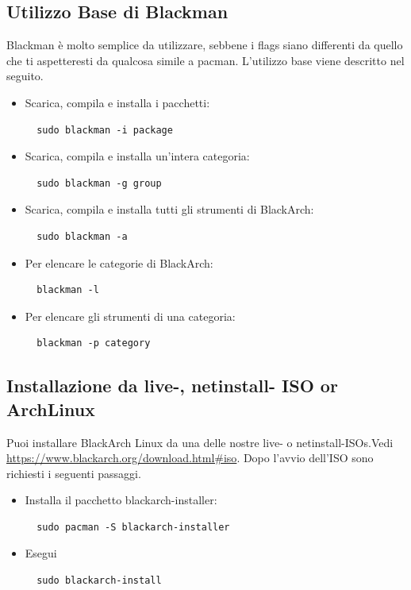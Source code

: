 \documentclass[a4paper, oneside, 11pt]{book}
\begin{document}
\subsection{Utilizzo Base di Blackman} Blackman è molto semplice da utilizzare, sebbene i flags siano differenti da quello che ti aspetteresti da qualcosa simile a pacman. L'utilizzo base viene descritto nel seguito.
\begin{itemize}
\item Scarica, compila e installa i pacchetti:
\begin{lstlisting}
  sudo blackman -i package
\end{lstlisting}

\item Scarica, compila e installa un'intera categoria:
\begin{lstlisting}
  sudo blackman -g group
\end{lstlisting}

\item Scarica, compila e installa tutti gli strumenti di BlackArch:
\begin{lstlisting}
  sudo blackman -a
\end{lstlisting}

\item Per elencare le categorie di BlackArch:
\begin{lstlisting}
  blackman -l
\end{lstlisting}

\item Per elencare gli strumenti di una categoria:
\begin{lstlisting}
  blackman -p category
\end{lstlisting}

\end{itemize}

\subsection{Installazione da live-, netinstall- ISO or ArchLinux}
Puoi installare BlackArch Linux da una delle nostre live- o netinstall-ISOs.Vedi
\url{https://www.blackarch.org/download.html#iso}. Dopo l'avvio dell'ISO sono richiesti i seguenti passaggi.
\begin{itemize}
\item Installa il pacchetto blackarch-installer:
\begin{lstlisting}
  sudo pacman -S blackarch-installer
\end{lstlisting}

\item Esegui
\begin{lstlisting}
  sudo blackarch-install
\end{lstlisting}

\end{itemize}
\end{document}
